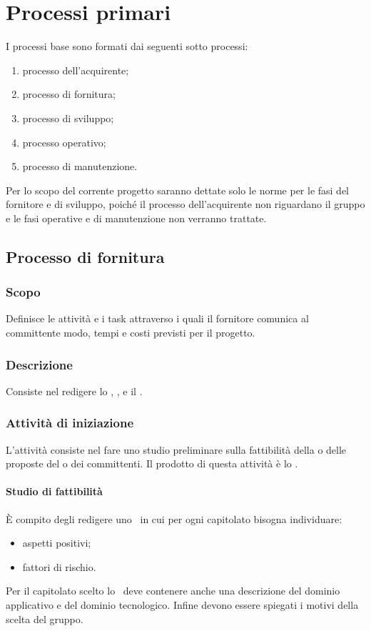 \documentclass[12pt,a4paper]{article}
\begin{document}
\section{Processi primari}
I processi base sono formati dai seguenti sotto processi:
\begin{enumerate}
\item processo dell'acquirente;
\item processo di fornitura;
\item processo di sviluppo;
\item processo operativo;
\item processo di manutenzione.
\end{enumerate}
Per lo scopo del corrente progetto saranno dettate solo le norme per le fasi del fornitore e di sviluppo, poiché il processo dell'acquirente non riguardano il gruppo e le fasi operative e di manutenzione non verranno trattate.

\subsection{Processo di fornitura}

\subsubsection{Scopo}
Definisce le attività e i task attraverso i quali il fornitore comunica al committente modo, tempi e costi previsti per il progetto.

\subsubsection{Descrizione}
Consiste nel redigere lo \SdF, \PdQ, e il \PdP.

\subsubsection{Attività di iniziazione}
L'attività consiste nel fare uno studio preliminare sulla fattibilità della o delle proposte del o dei committenti. Il prodotto di questa attività è lo \SdF.

\paragraph{Studio di fattibilità}
È compito degli \ANpl{} redigere uno \SdF\ in cui per ogni capitolato bisogna individuare:
\begin{itemize}
	\item aspetti positivi;
	\item fattori di rischio.
\end{itemize}
Per il capitolato scelto lo \SdF\ deve contenere anche una descrizione del dominio applicativo e del dominio tecnologico. Infine devono essere spiegati i motivi della scelta del gruppo.
\end{document}
